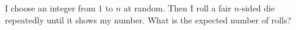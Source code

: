 I choose an integer from $1$ to $n$ at random. Then I roll a fair $n$-sided die repeatedly until it shows my number. What is the expected number of rolls?
